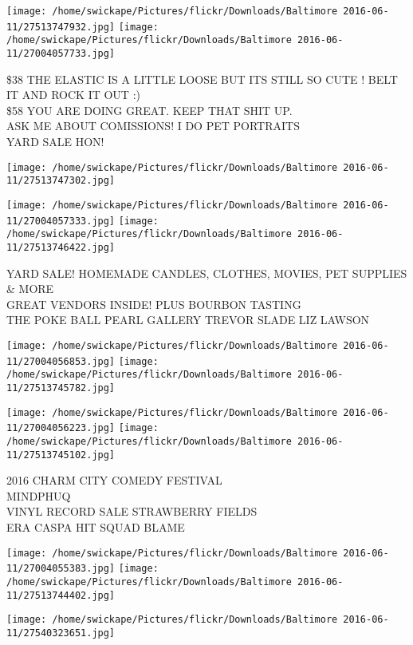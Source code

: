 \documentclass[10pt,letterpaper]{article}
\begin{document}
\texttt{[image: /home/swickape/Pictures/flickr/Downloads/Baltimore 2016-06-11/27513747932.jpg]}
\texttt{[image: /home/swickape/Pictures/flickr/Downloads/Baltimore 2016-06-11/27004057733.jpg]}

\$38 THE ELASTIC IS A LITTLE LOOSE BUT ITS STILL SO CUTE !  BELT IT AND ROCK IT OUT :)\\
\$58 YOU ARE DOING GREAT.  KEEP THAT SHIT UP.\\
ASK ME ABOUT COMISSIONS!  I DO PET PORTRAITS\\
YARD SALE HON!
\pagebreak

\texttt{[image: /home/swickape/Pictures/flickr/Downloads/Baltimore 2016-06-11/27513747302.jpg]}

\vspace{0.25in}
\texttt{[image: /home/swickape/Pictures/flickr/Downloads/Baltimore 2016-06-11/27004057333.jpg]}
\texttt{[image: /home/swickape/Pictures/flickr/Downloads/Baltimore 2016-06-11/27513746422.jpg]}

YARD SALE!  HOMEMADE CANDLES, CLOTHES, MOVIES, PET SUPPLIES \& MORE\\
GREAT VENDORS INSIDE!  PLUS BOURBON TASTING\\
THE POKE BALL PEARL GALLERY TREVOR SLADE LIZ LAWSON
\pagebreak

\texttt{[image: /home/swickape/Pictures/flickr/Downloads/Baltimore 2016-06-11/27004056853.jpg]}
\texttt{[image: /home/swickape/Pictures/flickr/Downloads/Baltimore 2016-06-11/27513745782.jpg]}

\texttt{[image: /home/swickape/Pictures/flickr/Downloads/Baltimore 2016-06-11/27004056223.jpg]}
\texttt{[image: /home/swickape/Pictures/flickr/Downloads/Baltimore 2016-06-11/27513745102.jpg]}

2016 CHARM CITY COMEDY FESTIVAL\\
MINDPHUQ\\
VINYL RECORD SALE STRAWBERRY FIELDS\\
ERA CASPA HIT SQUAD BLAME
\pagebreak

\texttt{[image: /home/swickape/Pictures/flickr/Downloads/Baltimore 2016-06-11/27004055383.jpg]}
\texttt{[image: /home/swickape/Pictures/flickr/Downloads/Baltimore 2016-06-11/27513744402.jpg]}

\vspace{0.25in}
\texttt{[image: /home/swickape/Pictures/flickr/Downloads/Baltimore 2016-06-11/27540323651.jpg]}
\end{document}
